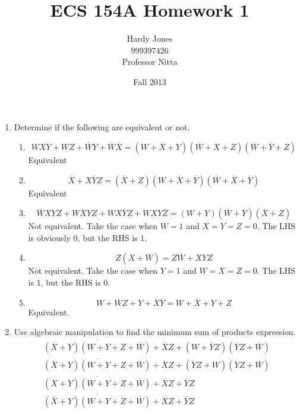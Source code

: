 \documentclass[12pt,letterpaper]{article}
\title{ECS 154A Homework 1\vspace{-2ex}}
\author{Hardy Jones\\
        999397426\\
        Professor Nitta\vspace{-2ex}}
\date{Fall 2013}
\begin{document}
  \maketitle

  \begin{enumerate}
    \item
      Determine if the following are equivalent or not.
      \begin{enumerate}
        \item
          \[
            WX\overline{Y} + WZ + \overline{W}Y + \overline{W} \overline{X} =
            (W + \overline{X} + Y)(\overline{W} + X + Z)(\overline{W} + \overline{Y} + Z)
          \]
          Equivalent
        \item
          \[
            \overline{X} + X\overline{Y}Z =
            (\overline{X} + Z)(W + \overline{X} + \overline{Y})(\overline{W} + \overline{X} + \overline{Y})
          \]
          Equivalent
        \item
          \[
            \overline{W}XYZ + W\overline{X}YZ + WX\overline{Y}Z + WXY\overline{Z} =
            (W + Y)(\overline{W} + \overline{Y})(\overline{X} + Z)
          \]
          Not equivalent.
          Take the case when $W = 1$ and $X = Y = Z = 0$.
          The LHS is obviously $0$, but the RHS is $1$.
        \item
          \[
            Z(X + \overline{W}) = Z\overline{W} + XYZ
          \]
          Not equivalent.
          Take the case when $Y = 1$ and $W = X = Z = 0$.
          The LHS is $1$, but the RHS is $0$.
        \item
          \[
            W + \overline{W}Z + Y + \overline{X}\overline{Y} = W + \overline{X} + Y + Z
          \]
          Equivalent.
      \end{enumerate}
    \item
      Use algebraic manipulation to find the minimum sum of products expression.
      \begin{align*}
        \overline{(\overline{X}+Y)(W+Y+Z+\overline{W})}+\overline{X}Z+(W+\overline{Y}Z)(\overline{Y}Z+\overline{W}) \\
        \overline{(\overline{X}+Y)(W+Y+Z+\overline{W})}+\overline{X}Z+(\overline{Y}Z+W)(\overline{Y}Z+\overline{W}) \tag{Commutativity} \\
        \overline{(\overline{X}+Y)(W+Y+Z+\overline{W})}+\overline{X}Z+\overline{Y}Z \tag{Combining} \\
        \overline{(\overline{X}+Y)(W+Y+Z+\overline{W})}+\overline{X}Z+\overline{Y}Z \tag{Distributivity} \\

\end{align*}
\end{enumerate}
\end{document}
